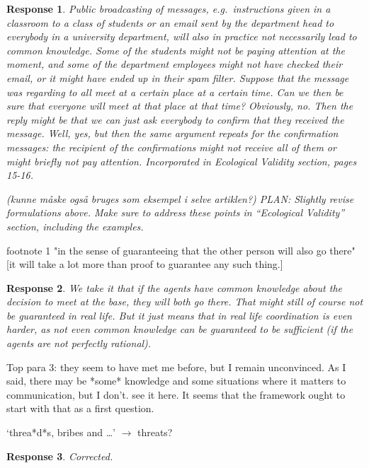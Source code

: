 \documentclass[a4paper]{article}
\newtheorem{response}{Response}
\begin{document}
\begin{response}
Public broadcasting of messages, e.g.\ instructions given in a classroom to a class of students or an email sent by the department head to everybody in a university department, will also in practice not necessarily lead to common knowledge. Some of the students might not be paying attention at the moment, and some of the department employees might not have checked their email, or it might have ended up in their spam filter. Suppose that the message was regarding to all meet at a certain place at a certain time. Can we then be sure that everyone will meet at that place at that time? Obviously, no. Then the reply might be that we can just ask everybody to confirm that they received the message. Well, yes, but then the same argument repeats for the confirmation messages: the recipient of the confirmations might not receive all of them or might briefly not pay attention. Incorporated in Ecological Validity section, pages 15-16.

 (kunne måske også bruges som eksempel i selve artiklen?) 
PLAN: Slightly revise formulations above. Make sure to address these points in ``Ecological Validity'' section, including the examples.
\end{response}

footnote 1 "in the sense of guaranteeing that the other person will also go there" [it will take a lot more than proof to guarantee any such thing.]

\begin{response}
We take it that if the agents have common knowledge about the decision to meet at the base, they \emph{will} both go there. That might still of course not be guaranteed in real life. But it just means that in real life coordination is even harder, as not even common knowledge can be guaranteed to be sufficient (if the agents are not perfectly rational).
\end{response}


Top para 3: they seem to have met me before, but I remain unconvinced. As I said, there may be *some* knowledge and some situations where it matters to communication, but I don't. see it here. It seems that the framework ought to start with that as a first question.


`threa*d*s, bribes and …' $\to$ threats?
\begin{response} Corrected. \end{response}
\end{document}
